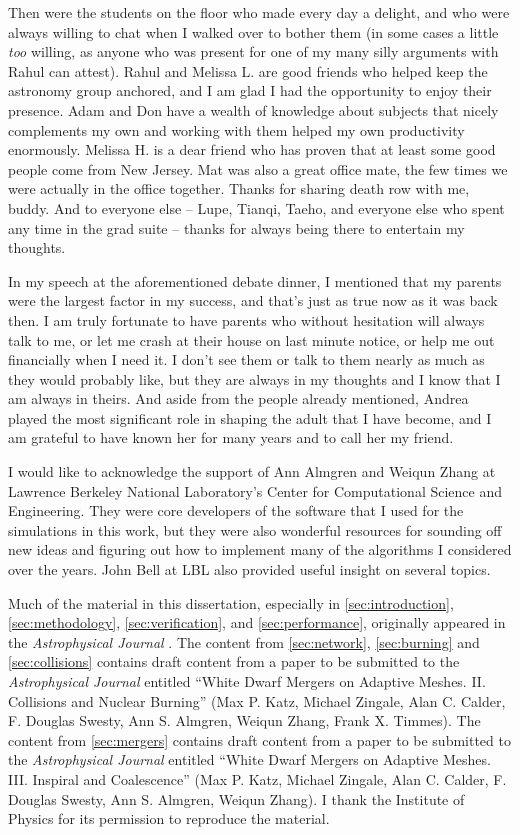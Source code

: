 \documentclass[12pt]{article}
\begin{document}
Then were the students on the floor who made every day a delight, and who
were always willing to chat when I walked over to bother them (in some cases
a little \textit{too} willing, as anyone who was present for one of my many
silly arguments with Rahul can attest). Rahul and Melissa L. are good friends 
who helped keep the astronomy group anchored, and I am glad I had the 
opportunity to enjoy their presence. Adam and Don have a wealth of knowledge 
about subjects that nicely complements my own and working with them helped my 
own productivity enormously. Melissa H. is a dear friend who has proven
that at least some good people come from New Jersey. Mat 
was also a great office mate, the few times we were actually in the office 
together. Thanks for sharing death row with me, buddy. And to everyone else
-- Lupe, Tianqi, Taeho, and everyone else who spent any time in the grad 
suite -- thanks for always being there to entertain my thoughts.

In my speech at the aforementioned debate dinner, I mentioned that my 
parents were the largest factor in my success, and that's just as true 
now as it was back then. I am truly fortunate to have parents who without 
hesitation will always talk to me, or let me crash at their house on 
last minute notice, or help me out financially when I need it. I don't 
see them or talk to them nearly as much as they would probably like, 
but they are always in my thoughts and I know that I am always in theirs.
And aside from the people already mentioned, Andrea played the most significant 
role in shaping the adult that I have become, and I am grateful to have known 
her for many years and to call her my friend.

I would like to acknowledge the support of Ann Almgren and Weiqun 
Zhang at Lawrence Berkeley National Laboratory's Center for Computational 
Science and Engineering. They were core developers of the software that 
I used for the simulations in this work, but they were also wonderful resources 
for sounding off new ideas and figuring out how to implement many of the 
algorithms I considered over the years. John Bell at LBL also provided useful
insight on several topics.

Much of the material in this dissertation, especially in \autoref{sec:introduction},
\autoref{sec:methodology}, \autoref{sec:verification}, and \autoref{sec:performance},
originally appeared in the \textit{Astrophysical Journal} \citep{wdmergerI}. The content
from \autoref{sec:network}, \autoref{sec:burning} and \autoref{sec:collisions} contains draft content from
a paper to be submitted to the \textit{Astrophysical Journal} entitled ``White Dwarf Mergers on
Adaptive Meshes. II. Collisions and Nuclear Burning'' (Max P. Katz, Michael Zingale,
Alan C. Calder, F. Douglas Swesty, Ann S. Almgren, Weiqun Zhang, Frank X. Timmes).
The content from \autoref{sec:mergers} contains draft content from a paper to be
submitted to the \textit{Astrophysical Journal} entitled ``White Dwarf Mergers on Adaptive
Meshes. III. Inspiral and Coalescence'' (Max P. Katz, Michael Zingale, Alan C. Calder,
F. Douglas Swesty, Ann S. Almgren, Weiqun Zhang). I thank the Institute of Physics
for its permission to reproduce the material.
\end{document}
